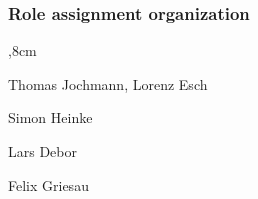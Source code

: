 \subsubsection{Role assignment organization}
\begin{description}
	,8cm
	\item[Adviser:] Thomas Jochmann, Lorenz Esch
	
	\item[Team leader:] Simon Heinke
	
	\item[Code:] Lars Debor
	
	\item[Version Management :] Felix Griesau
	
\end{description}



\clearpage
